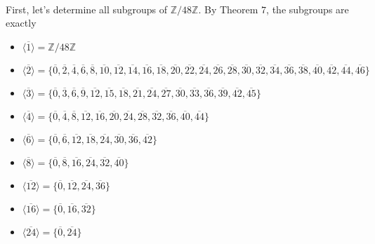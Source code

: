 \begin{solution}
    \\First, let's determine all subgroups of $\mathbb{Z}/48\mathbb{Z}$.
    By Theorem $7$, the subgroups are exactly
    \begin{itemize}
        \item $\langle \overline{1}\rangle = \mathbb{Z}/48\mathbb{Z}$
        \item $\langle \overline{2}\rangle = \{\overline{0}, \overline{2},
        \overline{4}, \overline{6}, \overline{8}, \overline{10},
        \overline{12}, \overline{14}, \overline{16}, \overline{18}, 
        \overline{20}, \overline{22}, \overline{24}, \overline{26},
        \overline{28}, \overline{30}, \overline{32}, \overline{34},
        \overline{36}, \overline{38}, \overline{40}, \overline{42},
        \overline{44}, \overline{46}\}$
        \item $\langle \overline{3}\rangle = \{\overline{0}, \overline{3},
        \overline{6}, \overline{9}, \overline{12}, \overline{15},
        \overline{18}, \overline{21}, \overline{24}, \overline{27},
        \overline{30}, \overline{33}, \overline{36}, \overline{39},
        \overline{42}, \overline{45}\}$

        \item $\langle \overline{4}\rangle = \{\overline{0}, \overline{4},
        \overline{8}, \overline{12}, \overline{16}, \overline{20},
        \overline{24}, \overline{28}, \overline{32}, \overline{36},
        \overline{40}, \overline{44}\}$

        \item $\langle \overline{6}\rangle = \{\overline{0}, \overline{6},
        \overline{12}, \overline{18}, \overline{24}, \overline{30},
        \overline{36}, \overline{42}\}$

        \item $\langle \overline{8}\rangle = \{\overline{0}, \overline{8},
        \overline{16}, \overline{24}, \overline{32}, \overline{40}\}$

        \item $\langle \overline{12}\rangle = \{\overline{0}, \overline{12},
        \overline{24}, \overline{36}\}$

        \item $\langle \overline{16}\rangle = \{\overline{0}, \overline{16},
        \overline{32}\}$

        \item $\langle \overline{24}\rangle = \{\overline{0},
        \overline{24}\}$


\end{itemize}
\end{solution}
